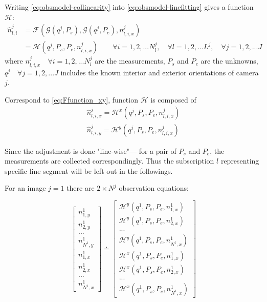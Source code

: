 Writing \eqref{eq:obsmodel-collinearity} into \eqref{eq:obsmodel-linefitting} gives a function $\mathcal{H}$:
\begin{equation} \label{eq:obsmodel}
\begin{split}
\hat{n}^j_{l,i} &= \mathcal{F}(\mathcal{G}(q^j,P_s),\mathcal{G}(q^j,P_e),n^j_{l,i,x})\\
&=\mathcal{H}(q^j,P_s,P_e,n^j_{l,i,x})
\qquad
\forall i=1,2,...N^j_l,\quad\forall l=1,2,...L^j,\quad\forall j=1,2,...J
\end{split}
\end{equation}
where $n^j_{l,i,x}\quad\forall i=1,2,...N^j_l$ are the measurements, $P_s$ and $P_e$ are the unknowns, $q^j\quad\forall j=1,2,...J$ includes the known interior and exterior orientations of camera $j$.\newline

Correspond to \cref{eq:Ffunction_xy}, function $\mathcal{H}$ is composed of
\begin{equation}
\begin{split}
\hat{n}^j_{l,i,x} = \mathcal{H}^x(q^j,P_s,P_e,n^j_{l,i,x})\\
\hat{n}^j_{l,i,y} = \mathcal{H}^y(q^j,P_s,P_e,n^j_{l,i,x})
\end{split}
\end{equation}

Since the adjustment is done "line-wise"--- for a pair of $P_s$ and $P_e$, the measurements are collected correspondingly. Thus the subscription $l$ representing specific line segment will be left out in the followings.

For an image $j=1$ there are $2\times N^j$ observation equations:

\begin{equation} \label{eq:obs-camera1}
\begin{bmatrix}
n^1_{1,y}\\[0.3em]
n^1_{2,y}\\[0.3em]
...\\[0.3em]
n^1_{N^1,y}\\[0.5em]
n^1_{1,x}\\[0.3em]
n^1_{2,x}\\[0.3em]
...\\[0.3em]
n^1_{N^1,x}
\end{bmatrix}
\doteq %
\begin{bmatrix}
\mathcal{H}^y(q^1,P_s,P_e,n^1_{1,x})\\[0.3em]
\mathcal{H}^y(q^1,P_s,P_e,n^1_{2,x})\\[0.3em]
...\\[0.3em]
\mathcal{H}^y(q^1,P_s,P_e,n^1_{N^1,x})\\[0.5em]
\mathcal{H}^x(q^1,P_s,P_e,n^1_{1,x})\\[0.3em]
\mathcal{H}^x(q^1,P_s,P_e,n^1_{2,x})\\[0.3em]
...\\[0.3em]
\mathcal{H}^x(q^1,P_s,P_e,n^1_{N^1,x})
\end{bmatrix}
\end{equation}


